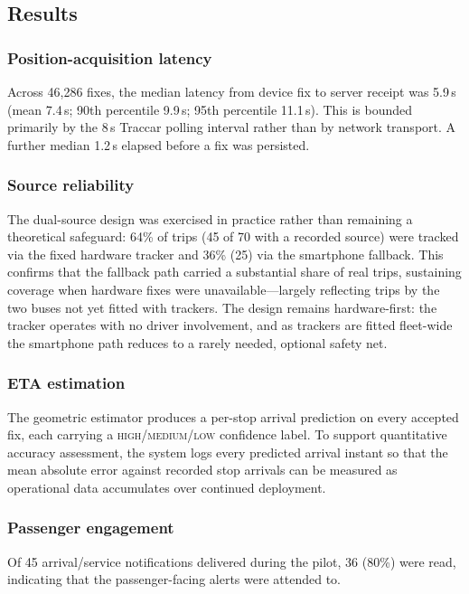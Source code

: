 \documentclass[conference]{IEEEtran}
\begin{document}
\subsection{Results}

\subsubsection{Position-acquisition latency}
Across 46{,}286 fixes, the median latency from device fix to server receipt
was 5.9\,s (mean 7.4\,s; 90th percentile 9.9\,s; 95th percentile 11.1\,s).
This is bounded primarily by the 8\,s Traccar polling interval rather than by
network transport. A further median 1.2\,s elapsed before a fix was persisted.

\subsubsection{Source reliability}
The dual-source design was exercised in practice rather than remaining a
theoretical safeguard: 64\% of trips (45 of 70 with a recorded source) were
tracked via the fixed hardware tracker and 36\% (25) via the smartphone
fallback. This confirms that the fallback path carried a substantial share of
real trips, sustaining coverage when hardware fixes were
unavailable---largely reflecting trips by the two buses not yet fitted with
trackers. The design remains hardware-first: the tracker operates with no
driver involvement, and as trackers are fitted fleet-wide the smartphone
path reduces to a rarely needed, optional safety net.

\subsubsection{ETA estimation}
The geometric estimator produces a per-stop arrival prediction on every
accepted fix, each carrying a \textsc{high}/\textsc{medium}/\textsc{low}
confidence label. To support quantitative accuracy assessment, the system
logs every predicted arrival instant so that the mean absolute error
against recorded stop arrivals can be measured as operational data
accumulates over continued deployment.

\subsubsection{Passenger engagement}
Of 45 arrival/service notifications delivered during the pilot, 36 (80\%) were
read, indicating that the passenger-facing alerts were attended to.
\end{document}
